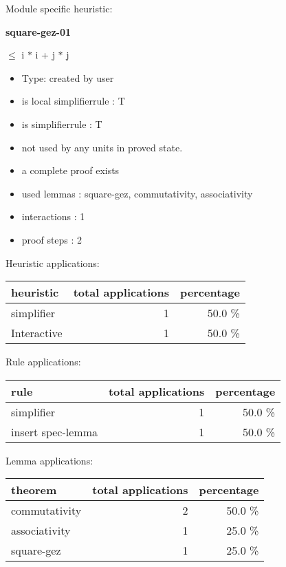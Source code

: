 \documentclass[a4paper]{article}
\begin{document}
Module specific heuristic:

\pagebreak

{\LARGE\bf square-gez-01}\label{lemma-square-gez-01}

\medskip

  $\le$ i $*$ i + j $*$ j

\begin{itemize}

\item Type: created by user

\item is local simplifierrule : T
\item is simplifierrule : T
\item not used by any units in proved state.
\item       a complete proof exists
\item       used lemmas  : square-gez, commutativity, associativity
\item       interactions : 1
\item       proof steps  : 2
\end{itemize}

\medskip


Heuristic applications:

\begin{supertabular}{l|r|r}
heuristic	& total applications & percentage \\ \hline
simplifier & 1 & 50.0 \% \\
Interactive & 1 & 50.0 \% \\

\end{supertabular}

Rule applications:

\begin{supertabular}{l|r|r}
rule	        & total applications & percentage \\ \hline
simplifier & 1 & 50.0 \% \\
insert spec-lemma & 1 & 50.0 \% \\

\end{supertabular}

Lemma applications:

\begin{supertabular}{l|r|r}
theorem	        & total applications & percentage \\ \hline
commutativity & 2 & 50.0 \% \\
associativity & 1 & 25.0 \% \\
square-gez & 1 & 25.0 \% \\

\end{supertabular}
\end{document}

